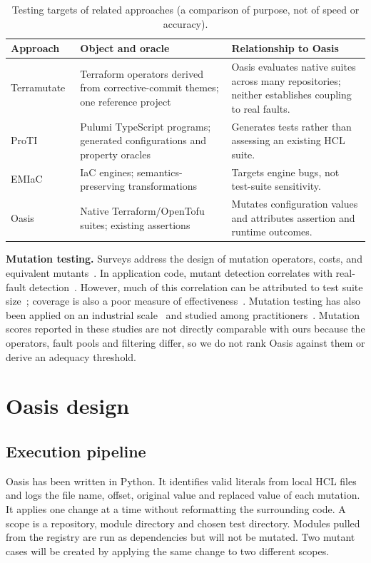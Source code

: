 \documentclass[3p,times,procedia]{elsarticle}
\begin{document}
\begin{table}[ht]
\caption{Testing targets of related approaches (a comparison of purpose, not of speed or accuracy).}\label{tab:capabilities}
\small\begin{tabularx}{\linewidth}{@{}p{2.1cm}XX@{}}\toprule
Approach & Object and oracle & Relationship to Oasis\\\midrule
Terramutate~\cite{ribeiro} & Terraform operators derived from corrective-commit themes; one reference project & Oasis evaluates native suites across many repositories; neither establishes coupling to real faults.\\
ProTI~\cite{proti} & Pulumi TypeScript programs; generated configurations and property oracles & Generates tests rather than assessing an existing HCL suite.\\
EMIaC~\cite{emiac} & IaC engines; semantics-preserving transformations & Targets engine bugs, not test-suite sensitivity.\\
Oasis & Native Terraform/OpenTofu suites; existing assertions & Mutates configuration values and attributes assertion and runtime outcomes.\\\bottomrule
\end{tabularx}\end{table}

\textbf{Mutation testing.} Surveys address the design of mutation operators, costs, and equivalent mutants~\cite{jia,papadakis,madeyski}. In application code, mutant detection correlates with real-fault detection~\cite{just}. However, much of this correlation can be attributed to test suite size~\cite{papadakis2018}; coverage is also a poor measure of effectiveness~\cite{coverage}. Mutation testing has also been applied on an industrial scale~\cite{practices,scale} and studied among practitioners~\cite{sanchez}. Mutation scores reported in these studies are not directly comparable with ours because the operators, fault pools and filtering differ, so we do not rank Oasis against them or derive an adequacy threshold.

\section{Oasis design}\label{sec:design}
\subsection{Execution pipeline}
Oasis has been written in Python. It identifies valid literals from local HCL files and logs the file name, offset,
original value and replaced value of each mutation. It applies one change at a time without reformatting the surrounding code.
A scope is a repository, module directory and chosen test directory. Modules pulled from the registry are run as
dependencies but will not be mutated. Two mutant cases will be created by applying the same change to two different
scopes.
\end{document}
